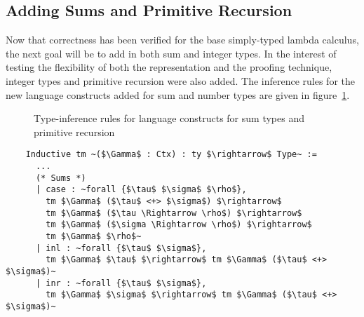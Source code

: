 \subsection{Adding Sums and Primitive Recursion}
  Now that correctness has been verified for the base simply-typed lambda calculus, the next goal will be to add in both sum and integer types.
  In the interest of testing the flexibility of both the representation and the proofing technique, integer types and primitive recursion were also added.
  The inference rules for the new language constructs added for sum and number types are given in figure~\ref{fig:sum_prim_infer}.

  \begin{figure}[H]
    \caption{Type-inference rules for language constructs for sum types and primitive recursion}
    \label{fig:sum_prim_infer}
  \end{figure}

  \begin{verbatim}
    Inductive tm ~($\Gamma$ : Ctx) : ty $\rightarrow$ Type~ :=
      ...
      (* Sums *)
      | case : ~forall {$\tau$ $\sigma$ $\rho$},
        tm $\Gamma$ ($\tau$ <+> $\sigma$) $\rightarrow$
        tm $\Gamma$ ($\tau \Rightarrow \rho$) $\rightarrow$
        tm $\Gamma$ ($\sigma \Rightarrow \rho$) $\rightarrow$
        tm $\Gamma$ $\rho$~
      | inl : ~forall {$\tau$ $\sigma$},
        tm $\Gamma$ $\tau$ $\rightarrow$ tm $\Gamma$ ($\tau$ <+> $\sigma$)~
      | inr : ~forall {$\tau$ $\sigma$},
        tm $\Gamma$ $\sigma$ $\rightarrow$ tm $\Gamma$ ($\tau$ <+> $\sigma$)~
  \end{verbatim}

